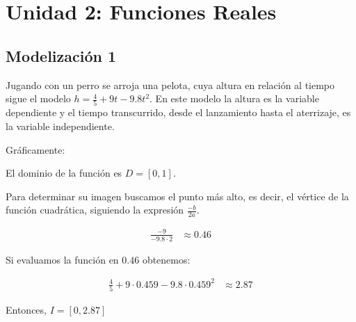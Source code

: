 \section*{Unidad 2: Funciones Reales}

\subsection*{Modelización 1}

Jugando con un perro se arroja una pelota, cuya altura en relación al tiempo sigue el modelo $h = \frac{4}{5} + 9t - 9.8t^2$. En este modelo la altura es la variable dependiente y el tiempo transcurrido, desde el lanzamiento hasta el aterrizaje, es la variable independiente. 

Gráficamente:

\begin{center}
\end{center}

El dominio de la función es $D = [0,1]$.

Para determinar su imagen buscamos el punto más alto, es decir, el vértice de la función cuadrática, siguiendo la expresión $\frac{-b}{2a}$. 

\begin{align*}
	\frac{-9}{-9.8 \cdot 2} &\approx 0.46
\end{align*}

Si evaluamos la función en $0.46$ obtenemos:

\begin{align*}
	\frac{4}{5} + 9 \cdot 0.459 - 9.8 \cdot 0.459^2 &\approx 2.87
\end{align*}

Entonces, $I = [0, 2.87]$
